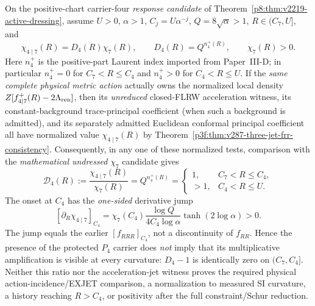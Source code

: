 \documentclass[12pt,a4paper]{article}
\begin{document}
\begin{corollary}
\label{p8:cor:v287-grade-four-same-action-onset}
On the positive-chart carrier-four \emph{response candidate} of
Theorem~\ref{p8:thm:v2219-active-dressing}, assume
$U>0$, $\alpha>1$, $C_j=U\alpha^{-j}$,
$Q=8\sqrt\alpha>1$, $R\in(C_7,U]$, and
\[
 \chi_{4\mid7}(R)=D_4(R)\chi_7(R),\qquad
 D_4(R)=Q^{n_4^+(R)},\qquad \chi_7(R)>0.
\]
Here $n_4^+$ is the positive-part Laurent index imported from
Paper~III-D; in particular $n_4^+=0$ for $C_7<R\le C_4$
and $n_4^+>0$ for $C_4<R\le U$.
If the \emph{same complete physical metric action} actually owns the
normalized local density $Z[f_{4\mid7}^+(R)-2\Lambda_{\rm ren}]$,
then its \emph{unreduced} closed-FLRW acceleration witness, its
constant-background trace-principal coefficient (when such a background
is admitted), and its separately admitted Euclidean conformal principal
coefficient all have normalized value $\chi_{4\mid7}(R)$ by
Theorem~\ref{p3f:thm:v287-three-jet-frr-consistency}.
Consequently, in any one of these normalized tests, comparison with
the \emph{mathematical undressed} $\chi_7$ candidate gives
\begin{equation}\label{p8:eq:v287-d4-same-action-ratio}
 \boxed{\mathscr D_4(R):=\frac{\chi_{4\mid7}(R)}{\chi_7(R)}
 =Q^{n_4^+(R)}
 =\begin{cases}1,&C_7<R\le C_4,\\>1,&C_4<R\le U.\end{cases}}
\end{equation}
The onset at $C_4$ has the \emph{one-sided} derivative jump
\begin{equation}\label{p8:eq:v287-d4-onset-jump}
 \boxed{[\partial_R\chi_{4\mid7}]_{C_4}
 =\chi_7(C_4)\frac{\log Q}{4C_4\log\alpha}
   \tanh(2\log\alpha)>0.}
\end{equation}
The jump equals the earlier $[f_{RRR}]_{C_4}$, not a discontinuity
of $f_{RR}$. Hence the presence of the protected $P_4$ carrier does
\emph{not} imply that its multiplicative amplification is visible
at every curvature: $D_4-1$ is identically zero on $(C_7,C_4]$.
Neither this ratio nor the acceleration-jet witness proves the
required physical action-incidence/\textup{EXJET} comparison, a
normalization to measured SI curvature, a history reaching $R>C_4$,
or positivity after the full constraint/Schur reduction.
\end{corollary}
\end{document}
